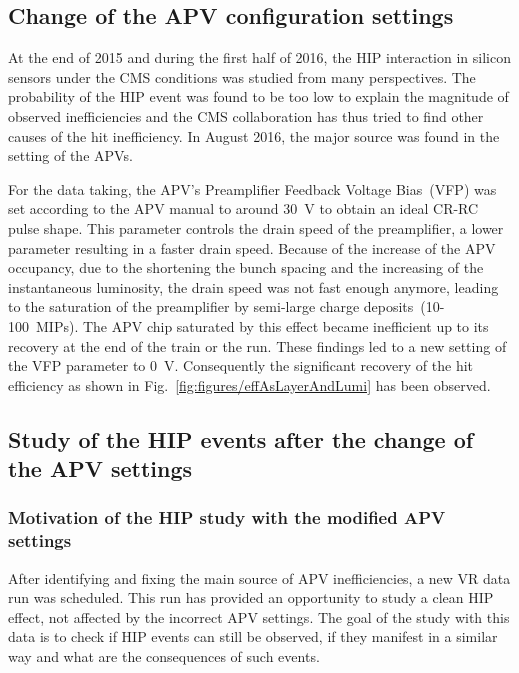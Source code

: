 
\subsection{Change of the APV configuration settings}

At the end of 2015 and during the first half of 2016, the HIP interaction in silicon sensors under the CMS conditions was studied from many perspectives. The probability of the HIP event was found to be too low to explain the magnitude of observed inefficiencies and the CMS collaboration has thus tried to find other causes of the hit inefficiency. In August 2016, the major source was found in the setting of the APVs.

For the data taking, the APV's Preamplifier Feedback Voltage Bias~(VFP) was set according to the APV manual to around 30~V to obtain an ideal CR-RC pulse shape. This parameter controls the drain speed of the preamplifier, a lower parameter resulting in a faster drain speed. Because of the increase of the APV occupancy, due to the shortening the bunch spacing and the increasing of the instantaneous luminosity, the drain speed was not fast enough anymore, leading to the saturation of the preamplifier by semi-large charge deposits~(10-100~MIPs). The APV chip saturated by this effect became inefficient up to its recovery at the end of the train or the run. These findings led to a new setting of the VFP parameter to 0~V. Consequently the significant recovery of the hit efficiency as shown in Fig.~\ref{fig:figures/effAsLayerAndLumi} has been observed.

\newpage

\subsection{Study of the HIP events after the change of the APV settings~\label{sec:secondStudy}}

\subsubsection{Motivation of the HIP study with the modified APV settings}

After identifying and fixing the main source of APV inefficiencies, a new VR data run was scheduled. This run has provided an opportunity to study a clean HIP effect, not affected by the incorrect APV settings. The goal of the study with this data is to check if HIP events can still be observed, if they manifest in a similar way and what are the consequences of such events.

